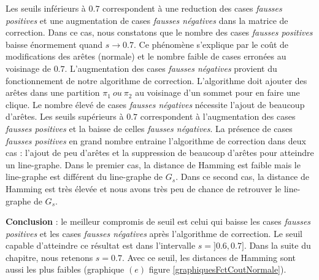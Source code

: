 Les seuils inf\'erieurs \`a $0.7$ correspondent \`a une reduction des cases {\em fausses positives} et une augmentation de cases {\em fausses n\'egatives} dans la matrice de correction. Dans ce cas, nous constatons que le nombre des  cases
{\em fausses positives} baisse \'enormement quand $s \rightarrow 0.7$. Ce ph\'enom\`ene s'explique par le co\^ut de modifications des ar\^etes (normale) et le nombre faible de cases erron\'ees au voisinage de  $0.7$. L'augmentation des cases  {\em fausses n\'egatives} provient du  fonctionnement de notre algorithme de correction.  L'algorithme doit ajouter des ar\^etes dans une partition $\pi_1 ~ou~ \pi_2$ au voisinage d'un sommet pour en faire une clique. Le nombre \'elev\'e de cases  {\em fausses n\'egatives} n\'ecessite l'ajout de beaucoup d'ar\^etes.
\newline
Les seuils sup\'erieurs \`a $0.7$ correspondent \`a l'augmentation des  cases {\em fausses positives} et la baisse de celles {\em fausses n\'egatives}. 
La pr\'esence de cases {\em fausses positives} en grand nombre entraine l'algorithme de correction dans deux cas :
l'ajout de peu d'ar\^etes  et 
la suppression de beaucoup d'ar\^etes pour atteindre un line-graphe.
Dans le premier cas, la distance de Hamming est faible mais le line-graphe est diff\'erent du line-graphe de $G_s$. 
Dans ce second cas, la distance de Hamming est tr\`es \'elev\'ee et nous avons tr\`es peu de chance de retrouver le line-graphe de $G_s$.
\newline

{\bf Conclusion} : 
le meilleur compromis de seuil est celui qui baisse les cases {\em fausses positives}  et les cases {\em fausses n\'egatives} apr\`es l'algorithme de correction.  Le seuil capable d'atteindre ce r\'esultat est dans l'intervalle $s=]0.6,0.7]$. Dans la suite du chapitre, nous retenons $s=0.7$.
Avec ce seuil, les distances de Hamming sont aussi les plus faibles (graphique $(e)$ figure \ref{graphiquesFctCoutNormale}). 